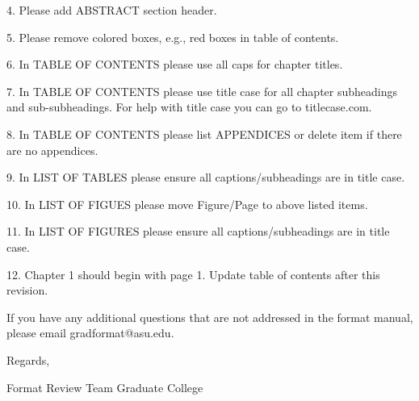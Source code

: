 4. Please add ABSTRACT section header. 

5. Please remove colored boxes, e.g., red boxes in table of contents. 

6. In TABLE OF CONTENTS please use all caps for chapter titles. 

7. In TABLE OF CONTENTS please use title case for all chapter subheadings and sub-subheadings. For help with title case you can go to titlecase.com. 

8. In TABLE OF CONTENTS please list APPENDICES or delete item if there are no appendices. 

9. In LIST OF TABLES please ensure all captions/subheadings are in title case. 

10. In LIST OF FIGUES please move Figure/Page to above listed items. 

11. In LIST OF FIGURES please ensure all captions/subheadings are in title case. 

12. Chapter 1 should begin with page 1. Update table of contents after this revision. 









If you have any additional questions that are not addressed in the format manual, please email gradformat@asu.edu.   

Regards, 

Format Review Team
Graduate College